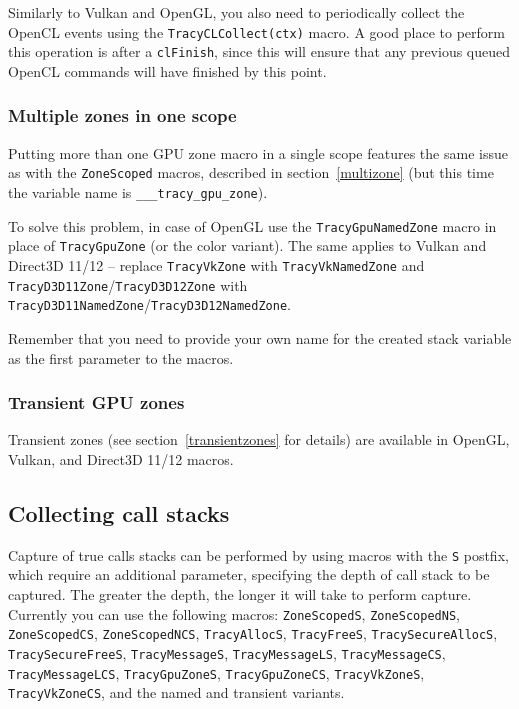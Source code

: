 \documentclass[hidelinks,titlepage,a4paper]{article}
\begin{document}
Similarly to Vulkan and OpenGL, you also need to periodically collect the OpenCL events using the \texttt{TracyCLCollect(ctx)} macro. A good place to perform this operation is after a \texttt{clFinish}, since this will ensure that any previous queued OpenCL commands will have finished by this point.

\subsubsection{Multiple zones in one scope}

Putting more than one GPU zone macro in a single scope features the same issue as with the \texttt{ZoneScoped} macros, described in section~\ref{multizone} (but this time the variable name is \texttt{\_\_\_tracy\_gpu\_zone}).

To solve this problem, in case of OpenGL use the \texttt{TracyGpuNamedZone} macro in place of \texttt{TracyGpuZone} (or the color variant). The same applies to Vulkan and Direct3D 11/12 -- replace \texttt{TracyVkZone} with \texttt{TracyVkNamedZone} and \texttt{TracyD3D11Zone}/\texttt{TracyD3D12Zone} with \texttt{TracyD3D11NamedZone}/\texttt{TracyD3D12NamedZone}.

Remember that you need to provide your own name for the created stack variable as the first parameter to the macros.

\subsubsection{Transient GPU zones}

Transient zones (see section~\ref{transientzones} for details) are available in OpenGL, Vulkan, and Direct3D 11/12 macros.

\subsection{Collecting call stacks}
\label{collectingcallstacks}

Capture of true calls stacks can be performed by using macros with the \texttt{S} postfix, which require an additional parameter, specifying the depth of call stack to be captured. The greater the depth, the longer it will take to perform capture. Currently you can use the following macros: \texttt{ZoneScopedS}, \texttt{ZoneScopedNS}, \texttt{ZoneScopedCS}, \texttt{ZoneScopedNCS}, \texttt{TracyAllocS}, \texttt{TracyFreeS}, \texttt{TracySecureAllocS}, \texttt{TracySecureFreeS}, \texttt{TracyMessageS}, \texttt{TracyMessageLS}, \texttt{TracyMessageCS}, \texttt{TracyMessageLCS}, \texttt{TracyGpuZoneS}, \texttt{TracyGpuZoneCS}, \texttt{TracyVkZoneS}, \texttt{TracyVkZoneCS}, and the named and transient variants.
\end{document}
